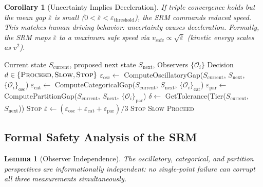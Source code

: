 \documentclass[twocolumn,10pt]{article}
\newtheorem{lemma}[theorem]{Lemma}
\newtheorem{corollary}[theorem]{Corollary}
\theoremstyle{definition}
\newcommand{\Scurrent}{S_{\mathrm{current}}}
\newcommand{\Snext}{S_{\mathrm{next}}}
\begin{document}
\begin{corollary}[Uncertainty Implies Deceleration]
\label{cor:uncertainty-deceleration}
If triple convergence holds but the mean gap $\bar{\varepsilon}$ is small ($0 < \bar{\varepsilon} < \varepsilon_{\mathrm{threshold}}$), the SRM commands reduced speed. This matches human driving behavior: uncertainty causes deceleration. Formally, the SRM maps $\bar{\varepsilon}$ to a maximum safe speed via $v_{\mathrm{safe}} \propto \sqrt{\bar{\varepsilon}}$ (kinetic energy scales as $v^2$).
\end{corollary}

\begin{algorithm}[t]
\caption{SufficiencyCheck($\Scurrent$, $\Snext$, $\{\mathcal{O}_i\}_{i=1}^K$)}
\label{alg:sufficiency}
\begin{algorithmic}[1]
\REQUIRE Current state $\Scurrent$, proposed next state $\Snext$, Observers $\{\mathcal{O}_i\}$
\ENSURE Decision $d \in \{\textsc{Proceed}, \textsc{Slow}, \textsc{Stop}\}$
\STATE $\varepsilon_{\mathrm{osc}} \leftarrow$ ComputeOscillatoryGap($\Scurrent$, $\Snext$, $\{\mathcal{O}_i\}_{\mathrm{osc}}$)
\STATE $\varepsilon_{\mathrm{cat}} \leftarrow$ ComputeCategoricalGap($\Scurrent$, $\Snext$, $\{\mathcal{O}_i\}_{\mathrm{cat}}$)
\STATE $\varepsilon_{\mathrm{par}} \leftarrow$ ComputePartitionGap($\Scurrent$, $\Snext$, $\{\mathcal{O}_i\}_{\mathrm{par}}$)
\STATE $\delta \leftarrow$ GetTolerance(Tier($\Scurrent$, $\Snext$)) 
    \RETURN \textsc{Stop} 
\ENDIF
\STATE $\bar{\varepsilon} \leftarrow (\varepsilon_{\mathrm{osc}} + \varepsilon_{\mathrm{cat}} + \varepsilon_{\mathrm{par}})/3$
    \RETURN \textsc{Stop} 
    \RETURN \textsc{Slow} 
\ENDIF
\RETURN \textsc{Proceed} 
\end{algorithmic}
\end{algorithm}

\subsection{Formal Safety Analysis of the SRM}

\begin{lemma}[Observer Independence]
\label{lem:observer-independence}
The oscillatory, categorical, and partition perspectives are informationally independent: no single-point failure can corrupt all three measurements simultaneously.
\end{lemma}
\end{document}
